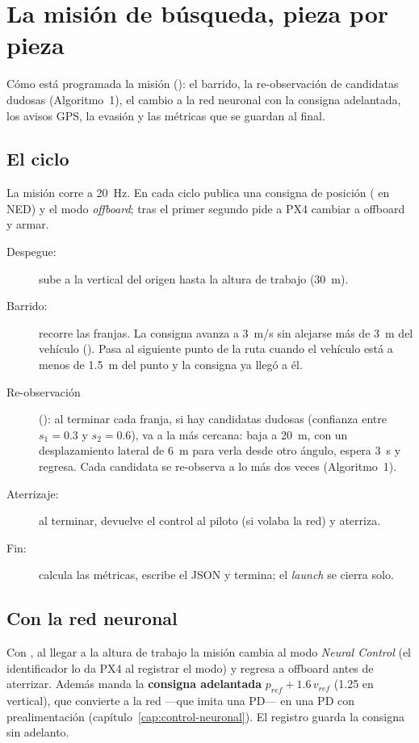 \chapter{La misión de búsqueda, pieza por pieza}
\label{cap:mision}

\begin{enpocas}
Cómo está programada la misión (): el barrido, la re-observación de candidatas dudosas
(Algoritmo~1), el cambio a la red neuronal con la consigna adelantada, los avisos GPS, la evasión y las
métricas que se guardan al final.
\end{enpocas}

\section{El ciclo}

La misión corre a 20~Hz. En cada ciclo publica una consigna de posición ( en
NED) y el modo \emph{offboard}; tras el primer segundo pide a PX4 cambiar a offboard y armar.

\begin{description}
  \item[Despegue:] sube a la vertical del origen hasta la altura de trabajo (30~m).
  \item[Barrido:] recorre las franjas. La consigna avanza a 3~m/s sin alejarse más de 3~m del
        vehículo (). Pasa al siguiente punto de la ruta cuando el vehículo está a
        menos de 1.5~m del punto y la consigna ya llegó a él.
  \item[Re-observación] (): al terminar cada franja, si hay candidatas dudosas
        (confianza entre $s_1 = 0.3$ y $s_2 = 0.6$), va a la más cercana: baja a 20~m, con un
        desplazamiento lateral de 6~m para verla desde otro ángulo, espera 3~s y regresa. Cada candidata
        se re-observa a lo más dos veces (Algoritmo~1).
  \item[Aterrizaje:] al terminar, devuelve el control al piloto (si volaba la red) y aterriza.
  \item[Fin:] calcula las métricas, escribe el JSON y termina; el \emph{launch} se cierra solo.
\end{description}

\section{Con la red neuronal}

Con , al llegar a la altura de trabajo la misión cambia al modo \emph{Neural
Control} (el identificador lo da PX4 al registrar el modo) y regresa a offboard antes de aterrizar.
Además manda la \textbf{consigna adelantada} $p_{ref} + 1.6\,v_{ref}$ (1.25 en vertical), que convierte
a la red ---que imita una PD--- en una PD con prealimentación (capítulo~\ref{cap:control-neuronal}). El
registro guarda la consigna sin adelanto.

